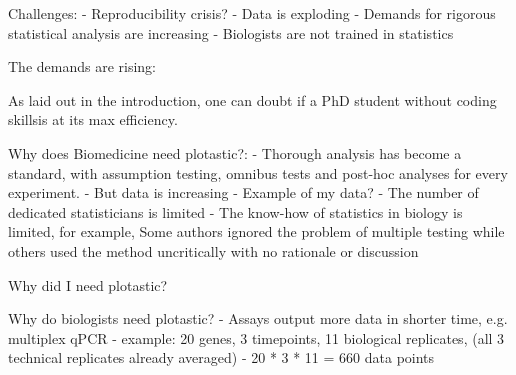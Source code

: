 







Challenges:
- Reproducibility crisis?
- Data is exploding
- Demands for rigorous statistical analysis are increasing
- Biologists are not trained in statistics


The demands are rising: \cite{moreno-indiasStatisticalMachineLearning2021}



As laid out in the introduction, one can doubt if a PhD student without coding
skillsis at its max efficiency.

Why does Biomedicine need plotastic?:
- Thorough analysis has become a standard, with assumption testing, omnibus
tests and post-hoc analyses for every experiment.
- But data is increasing
- Example of my data?
- The number of dedicated statisticians is limited
- The know-how of statistics in biology is limited, for example, Some authors
ignored the problem of multiple testing while others used the method
uncritically with no rationale or discussion \cite{pernegerWhatWrongBonferroni1998,armstrongWhenUseBonferroni2014}


Why did I need plotastic?

Why do biologists need plotastic?
- Assays output more data in shorter time, e.g. multiplex qPCR
- example: 20 genes, 3 timepoints, 11 biological replicates, (all 3
technical replicates already averaged)
- 20 * 3 * 11 = 660 data points

